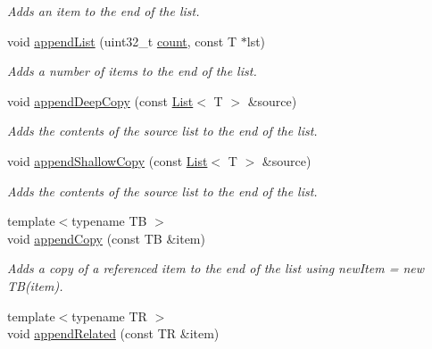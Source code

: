 \begin{DoxyCompactItemize}
\begin{DoxyCompactList}\small\item\em \-Adds an item to the end of the list. \end{DoxyCompactList}\item 
\hypertarget{classxsens_1_1List_a9a8b7423cfb353aa98634622a8f7e2b8}{void \hyperlink{classxsens_1_1List_a9a8b7423cfb353aa98634622a8f7e2b8}{append\-List} (uint32\-\_\-t \hyperlink{classxsens_1_1List_a430ba09ad069373d9e92b0b92b10546b}{count}, const \-T $\ast$lst)}\label{classxsens_1_1List_a9a8b7423cfb353aa98634622a8f7e2b8}

\begin{DoxyCompactList}\small\item\em \-Adds a number of items to the end of the list. \end{DoxyCompactList}\item 
\hypertarget{classxsens_1_1List_a281f422db0c020845ff40f15dcd0fb47}{void \hyperlink{classxsens_1_1List_a281f422db0c020845ff40f15dcd0fb47}{append\-Deep\-Copy} (const \hyperlink{classxsens_1_1List}{\-List}$<$ \-T $>$ \&source)}\label{classxsens_1_1List_a281f422db0c020845ff40f15dcd0fb47}

\begin{DoxyCompactList}\small\item\em \-Adds the contents of the source list to the end of the list. \end{DoxyCompactList}\item 
\hypertarget{classxsens_1_1List_a08ccba42ccb4d17099ef7c0a225b17b5}{void \hyperlink{classxsens_1_1List_a08ccba42ccb4d17099ef7c0a225b17b5}{append\-Shallow\-Copy} (const \hyperlink{classxsens_1_1List}{\-List}$<$ \-T $>$ \&source)}\label{classxsens_1_1List_a08ccba42ccb4d17099ef7c0a225b17b5}

\begin{DoxyCompactList}\small\item\em \-Adds the contents of the source list to the end of the list. \end{DoxyCompactList}\item 
\hypertarget{classxsens_1_1List_a9af08ce378aaa86d5a84d06dfec4243d}{{\footnotesize template$<$typename T\-B $>$ }\\void \hyperlink{classxsens_1_1List_a9af08ce378aaa86d5a84d06dfec4243d}{append\-Copy} (const \-T\-B \&item)}\label{classxsens_1_1List_a9af08ce378aaa86d5a84d06dfec4243d}

\begin{DoxyCompactList}\small\item\em \-Adds a copy of a referenced item to the end of the list using new\-Item = new \-T\-B(item). \end{DoxyCompactList}\item 
\hypertarget{classxsens_1_1List_af0f325e48e5aea053766f028bae9671b}{{\footnotesize template$<$typename T\-R $>$ }\\void \hyperlink{classxsens_1_1List_af0f325e48e5aea053766f028bae9671b}{append\-Related} (const \-T\-R \&item)}\label{classxsens_1_1List_af0f325e48e5aea053766f028bae9671b}


\end{DoxyCompactItemize}
